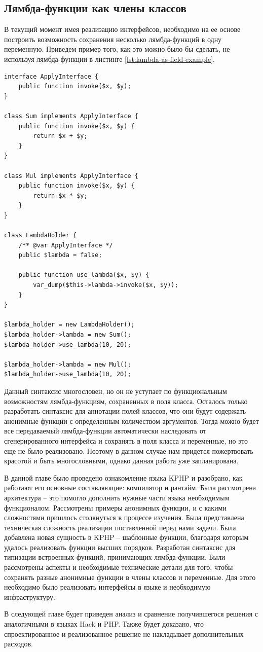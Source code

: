 \subsection{Лямбда-функции как члены классов}
В текущий момент имея реализацию интерфейсов, необходимо на ее основе построить возможность сохранения несколько лямбда-функций в одну переменную.
Приведем пример того, как это можно было бы сделать, не используя лямбда-функции в листинге \ref{lst:lambda-as-field-example}.
\begin{lstlisting}[caption={Пример замены сохранения лямбда-функции в поле класса},label={lst:lambda-as-field-example}]
interface ApplyInterface {
    public function invoke($x, $y);
}

class Sum implements ApplyInterface {
    public function invoke($x, $y) {
        return $x + $y;
    }
}

class Mul implements ApplyInterface {
    public function invoke($x, $y) {
        return $x * $y;
    }
}

class LambdaHolder {
    /** @var ApplyInterface */
    public $lambda = false;

    public function use_lambda($x, $y) {
        var_dump($this->lambda->invoke($x, $y));
    }
}

$lambda_holder = new LambdaHolder();
$lambda_holder->lambda = new Sum();
$lambda_holder->use_lambda(10, 20);

$lambda_holder->lambda = new Mul();
$lambda_holder->use_lambda(10, 20);
\end{lstlisting}

Данный синтаксис многословен, но он не уступает по функциональным возможностям лямбда-функциям, сохраненных в поля класса.
Осталось только разработать синтаксис для аннотации полей классов, что они будут содержать анонимные функции с определенным количеством аргументов.
Тогда можно будет все передаваемый лямбда-функции автоматически наследовать от сгенерированного интерфейса и сохранять в поля класса и переменные, но это еще не было реализовано.
Поэтому в данном случае нам придется пожертвовать красотой и быть многословными, однако данная работа уже запланирована.

\chapterconclusion
В данной главе было проведено ознакомление языка KPHP и разобрано, как работают его основные составляющие: компилятор и рантайм.
Была рассмотрена архитектура -- это помогло дополнить нужные части языка необходимым функционалом.
Рассмотрены примеры анонимных функции, и с какими сложностями пришлось столкнуться в процессе изучения.
Была представлена техническая сложность реализации поставленной перед нами задачи.
Была добавлена новая сущность в KPHP -- шаблонные функции, благодаря которым удалось реализовать функции высших порядков.
Разработан синтаксис для типизации встроенных функций, принимающих лямбда-функции.
Были рассмотрены аспекты и необходимые технические детали для того, чтобы сохранять разные анонимные функции в члены классов и переменные.
Для этого необходимо было реализовать интерфейсы в языке и необходимую инфраструктуру.

В следующей главе будет приведен анализ и сравнение получившегося решения с аналогичными в языках Hack и PHP.
Также будет доказано, что спроектированное и реализованное решение не накладывает дополнительных расходов.
